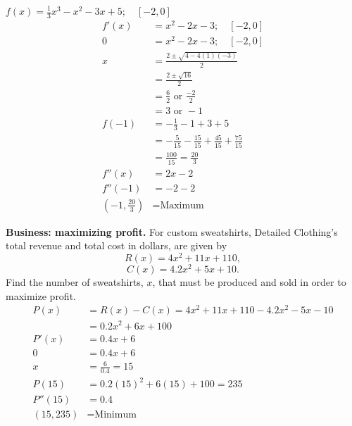 \documentclass[12pt]{article}
\newenvironment{problem}[2][]{
    \begin{trivlist}
        \item[
            {\bfseries #1}
            {\bfseries #2.}
        ]
}{\end{trivlist}}
\begin{document}
\begin{problem}{31}
    $f(x) = \frac{1}{3} x^3 - x^2 - 3x + 5; \quad [-2, 0]$
    \begin{align}
        f'(x) &= x^2 - 2x - 3; \quad [-2, 0] \\
        0 &= x^2 - 2x - 3; \quad [-2, 0] \\
        x &= \frac{2 \pm \sqrt{4 - 4\left(1\right)\left(-3\right)}}{2} \\
        &= \frac{2 \pm \sqrt{16}}{2} \\
        &= \frac{6}{2} \text{ or } \frac{-2}{2} \\
        &= 3 \text{ or } -1 \\
        f(-1) &= -\frac{1}{3} - 1 + 3 + 5 \\
        &= -\frac{5}{15} - \frac{15}{15} + \frac{45}{15} + \frac{75}{15} \\
        &= \frac{100}{15} = \frac{20}{3} \\
        f''(x) &= 2x - 2 \\
        f''(-1) &= -2 - 2 \\
        \left(-1, \frac{20}{3}\right) &= \text{Maximum}
    \end{align}
\end{problem}

\begin{problem}{32}
    \textbf{Business: maximizing profit.}
    For custom sweatshirts, Detailed Clothing's total revenue and total cost in dollars, are given by
    $$R(x) = 4x^2 + 11x + 110,$$
    $$C(x) = 4.2x^2 + 5x + 10.$$
    Find the number of sweatshirts, $x$, that must be produced and sold in order to maximize profit.
    \begin{align}
        P(x) &= R(x) - C(x) = 4x^2 + 11x + 110 - 4.2x^2 - 5x - 10 \\
        &= 0.2x^2 + 6x + 100 \\
        P'(x) &= 0.4x + 6 \\
        0 &= 0.4x + 6 \\
        x &= \frac{6}{0.4} = 15 \\
        P(15) &= 0.2\left(15\right)^2 + 6\left(15\right) + 100 = 235 \\
        P''(15) &= 0.4 \\
        (15, 235) &= \text{Minimum}
    \end{align}
\end{problem}
\end{document}
